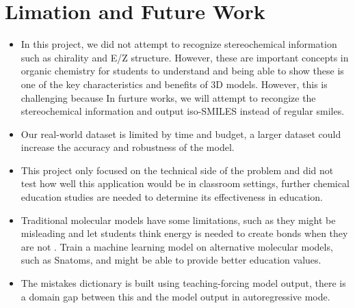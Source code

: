 \documentclass[12pt]{article}
\begin{document}
\section{Limation and Future Work}
\begin{itemize}
\item In this project, we did not attempt to recognize stereochemical information such as chirality and E/Z structure. However, these are important concepts in organic chemistry for students to understand and being able to show these is one of the key characteristics and benefits of 3D models. However, this is challenging because  
In furture works, we will attempt to recongize the stereochemical information and output iso-SMILES instead of regular smiles. 

\item  Our real-world dataset is limited by time and budget, a larger dataset could increase the accuracy and robustness of the model. 

\item This project only focused on the technical side of the problem and did not test how well this application would be in classroom settings, further chemical education studies are needed to determine its effectiveness in education. 

\item Traditional molecular models have some limitations, such as they might be misleading and let students think energy is needed to create bonds when they are not \autocite{snatoms}. Train a machine learning model on alternative molecular models, such as Snatoms\autocite{snatoms}, and might be able to provide better education values. 

\item  The mistakes dictionary is built using teaching-forcing model output, there is a domain gap between this and the model output in autoregressive mode. 


\end{itemize}
\end{document}
